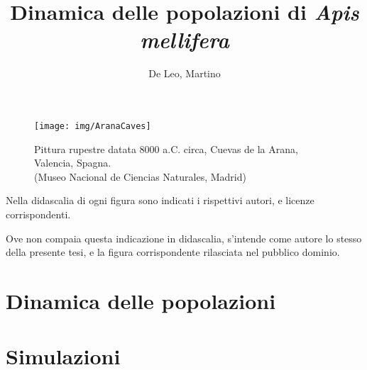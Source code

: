 \documentclass[12pt,a4paper,oneside,hidelinks]{book} %
\author{De Leo, Martino}
\title{Dinamica delle popolazioni di \emph{Apis mellifera} }
\begin{document}
\maketitle %

\frontmatter


\pagebreak



\begin{figure}[hbp]
    \centering
    \texttt{[image: img/AranaCaves]}

    \caption[Pittura rupestre di Arana.]{Pittura rupestre datata 8000 a.C. circa, Cuevas de la Arana, Valencia, Spagna. \\ (Museo Nacional de Ciencias Naturales, Madrid)}
    \label{img:arana}
\end{figure}

\cleardoublepage
\tableofcontents

\listoffigures
Nella didascalia di ogni figura sono indicati i rispettivi autori, e licenze corrispondenti.

Ove non compaia questa indicazione in didascalia, s'intende come autore lo stesso della presente tesi, e la figura
corrispondente rilasciata nel pubblico dominio.

\listoftables


\mainmatter

\clearpage
\part{Dinamica delle popolazioni}




\part{Simulazioni}





\appendix



\backmatter



\cleardoublepage
{}
\nocite{*} %
\printbibliography
\end{document}
